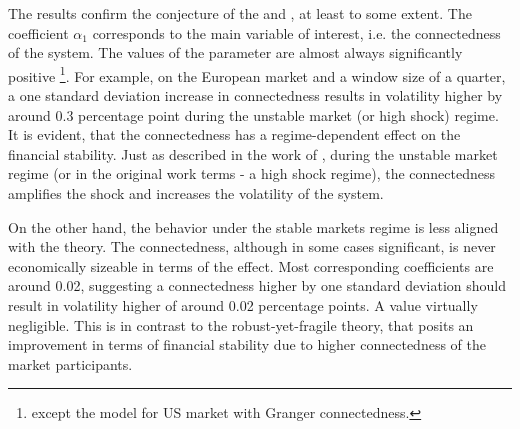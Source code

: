 \documentclass[12pt]{article}
\begin{document}
The results confirm the conjecture of the \citet{acemoglu13} and \citet{haldane13}, at least to some extent. The coefficient $\alpha_1$ corresponds to the main variable of interest, i.e. the connectedness of the system. The values of the parameter are almost always significantly positive \footnote{except the model for US market with Granger connectedness.}. For example, on the European market and a window size of a quarter, a one standard deviation increase in connectedness results in volatility higher by around 0.3 percentage point during the unstable market (or high shock) regime. It is evident, that the connectedness has a regime-dependent effect on the financial stability. Just as described in the work of \citet{acemoglu13}, during the unstable market regime (or in the original work terms - a high shock regime), the connectedness amplifies the shock and increases the volatility of the system. 

On the other hand, the behavior under the stable markets regime is less aligned with the theory. The connectedness, although in some cases significant, is never economically sizeable in terms of the effect. Most corresponding coefficients are around 0.02, suggesting a connectedness higher by one standard deviation should result in volatility higher of around 0.02 percentage points. A value virtually negligible. This is in contrast to the robust-yet-fragile theory, that posits an improvement in terms of financial stability due to higher connectedness of the market participants.
\end{document}
